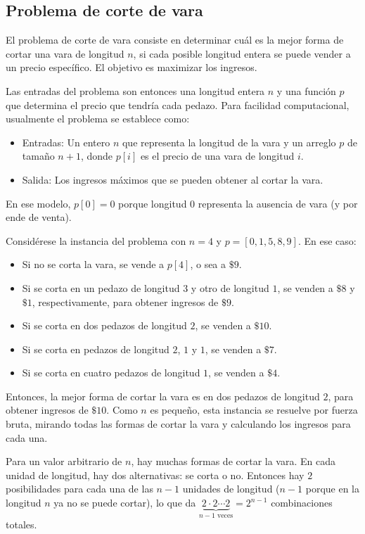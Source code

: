 \subsection{Problema de corte de vara}

El problema de corte de vara consiste en determinar cuál es la mejor forma de cortar una vara de longitud $n$, si cada posible longitud entera se puede vender a un precio específico. El objetivo es maximizar los ingresos.

Las entradas del problema son entonces una longitud entera $n$ y una función $p$ que determina el precio que tendría cada pedazo. Para facilidad computacional, usualmente el problema se establece como:
\begin{itemize}
  \item Entradas: Un entero $n$ que representa la longitud de la vara y un arreglo $p$ de tamaño $n+1$, donde $p[i]$ es el precio de una vara de longitud $i$.
  \item Salida: Los ingresos máximos que se pueden obtener al cortar la vara.
\end{itemize}
En ese modelo, $p[0] = 0$ porque longitud $0$ representa la ausencia de vara (y por ende de venta).

Considérese la instancia del problema con $n=4$ y $p = [0, 1, 5, 8, 9]$. En ese caso:
\begin{itemize}
  \item Si no se corta la vara, se vende a $p[4]$, o sea a $\$9$.
  \item Si se corta en un pedazo de longitud $3$ y otro de longitud $1$, se venden a $\$8$ y $\$1$, respectivamente, para obtener ingresos de $\$9$.
  \item Si se corta en dos pedazos de longitud $2$, se venden a $\$10$.
  \item Si se corta en pedazos de longitud $2$, $1$ y $1$, se venden a $\$7$.
  \item Si se corta en cuatro pedazos de longitud $1$, se venden a $\$4$.
\end{itemize}
Entonces, la mejor forma de cortar la vara es en dos pedazos de longitud $2$, para obtener ingresos de $\$10$. Como $n$ es pequeño, esta instancia se resuelve por fuerza bruta, mirando todas las formas de cortar la vara y calculando los ingresos para cada una.

Para un valor arbitrario de $n$, hay muchas formas de cortar la vara. En cada unidad de longitud, hay dos alternativas: se corta o no. Entonces hay $2$ posibilidades para cada una de las $n-1$ unidades de longitud ($n-1$ porque en la longitud $n$ ya no se puede cortar), lo que da $\underbrace{2\cdot2\cdots2}_{n-1 \text{ veces}} = 2^{n-1}$ combinaciones totales.

